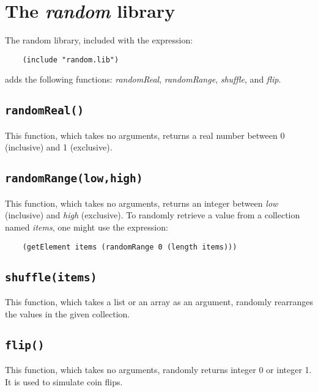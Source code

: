 \section{The {\it random} library}

The random library, included with the expression:

\begin{verbatim}
    (include "random.lib")
\end{verbatim}

adds the following functions:
{\it randomReal}, {\it randomRange}, {\it shuffle}, and {\it flip}.

\subsection*{{\tt randomReal()}}

This function,  which takes no arguments, returns a real number
between 0 (inclusive) and 1 (exclusive).

\subsection*{{\tt randomRange(low,high)}}

This function,  which takes no arguments, returns an integer
between {\it low} (inclusive) and {\it high} (exclusive).
To randomly retrieve a value from a collection named {\it items},
one might use the expression:

\begin{verbatim}
    (getElement items (randomRange 0 (length items)))
\end{verbatim}

\subsection*{{\tt shuffle(items)}}

This function, which takes a list or an array as an argument,
randomly rearranges the values in the given collection.

\subsection*{{\tt flip()}}

This function, which takes no arguments,
randomly returns integer 0 or integer 1.
It is used to simulate coin flips.
